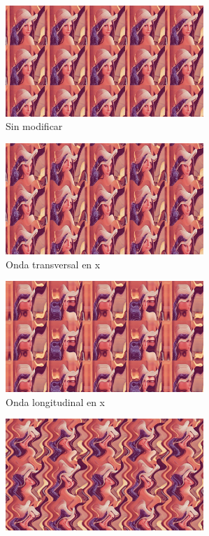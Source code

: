 \begin{figure}[h]
	\centering
	\begin{subfigure}[b]{0.48\textwidth}
		\centering
		\includegraphics[width=7.5cm]{archivos/deformation1}
		\caption{Sin modificar}
		\label{fig:alldeformations}
	\end{subfigure}
	\begin{subfigure}[b]{0.48\textwidth}
		\centering
		\includegraphics[width=7.5cm]{archivos/deformation2}
		\caption{Onda transversal en x}
	\end{subfigure}
	\begin{subfigure}[b]{0.48\textwidth}
		\centering
		\includegraphics[width=7.5cm]{archivos/deformation3}
		\caption{Onda longitudinal en x}
	\end{subfigure}
	\begin{subfigure}[b]{0.48\textwidth}
		\centering
		\includegraphics[width=7.5cm]{archivos/deformation4}

\end{subfigure}
\end{figure}
